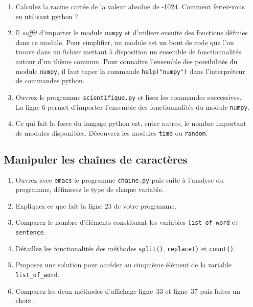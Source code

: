 \begin{enumerate}
\item Calculez la racine carrée de la valeur absolue de -1024.
  Comment feriez-vous en utilisant python ?

\item Il \textit{suffit} d'importer le module \texttt{numpy} et d'utiliser ensuite
  des fonctions définies dans ce module.
  Pour simplifier, un module est un bout de code que l'on trouve dans un fichier
  mettant à disposition un ensemble de fonctionnalités autour d'un thème commun.
  Pour connaître l'ensemble des possibilités du module \texttt{numpy}, il faut taper la commande
  \texttt{help("numpy")} dans l'interpréteur de commandes python.


\item Ouvrez le programme \texttt{scientifique.py} et lisez les commandes successives.
  La ligne 6 permet d'importer l'ensemble des fonctionnalités du module \texttt{numpy}.

\item Ce qui fait la force du langage python est, entre autres, le nombre important de modules disponibles.
  Découvrez les modules \texttt{time} ou \texttt{random}.


\end{enumerate}




\subsection{Manipuler les chaînes de caractères}


\begin{enumerate}

\item Ouvrez avec  \texttt{emacs} le  programme \texttt{chaine.py} puis
  suite à l'analyse du programme, définissez le type de chaque variable.

\item Expliquez ce que fait la ligne 23 de votre programme.

\item Comparez le nombre d'éléments constituant les variables \texttt{list\_of\_word} et  \texttt{sentence}.

\item Détaillez les fonctionalités des méthodes \texttt{split()}, \texttt{replace()} et \texttt{count()}.

\item Proposez une solution pour accéder au cinquième élément de la variable \texttt{list\_of\_word}.

\item Comparez les deux méthodes d'affichage ligne~33 et ligne~37 puis faites un choix.


\end{enumerate}


